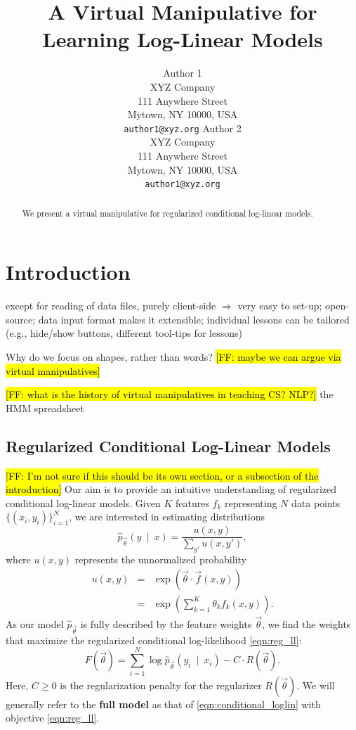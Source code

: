 \documentclass[11pt,letterpaper]{article}
\title{A Virtual Manipulative for Learning Log-Linear Models}
\author{
	 Author 1\\
	    XYZ Company\\
	    111 Anywhere Street\\
	    Mytown, NY 10000, USA\\
	    {\tt author1@xyz.org}
	  \And
	  Author 2\\
	    XYZ Company\\
	    111 Anywhere Street\\
	    Mytown, NY 10000, USA\\
	    {\tt author1@xyz.org}
 }
\date{}
\newcommand{\Note}[1]{}
\renewcommand{\Note}[1]{\hl{[#1]}}
\newcommand{\NoteSigned}[3]{{\sethlcolor{#2}\Note{#1: #3}}}
\newcommand{\NoteFF}[1]{\NoteSigned{FF}{LightBlue}{#1}}
\begin{document}
\maketitle

\begin{abstract}
We present a virtual manipulative for regularized conditional log-linear models. 
\end{abstract}

\section{Introduction}\label{sec:intro}
except for reading of data files, purely client-side $\Rightarrow$ very easy to set-up;
open-source;
data input format makes it extensible;
individual lessons can be tailored (e.g., hide/show buttons, different tool-tips for lessons)

Why do we focus on shapes, rather than words? \NoteFF{maybe we can argue via virtual manipulatives}

\NoteFF{what is the history of virtual manipulatives in teaching CS? NLP?} the HMM spreadsheet \cite{eisner-2002-tnlp}

\subsection{Regularized Conditional Log-Linear Models} \label{sec:model} 
\NoteFF{I'm not sure if this should be its own section, or a subsection of the introduction} 
Our aim is to provide an intuitive understanding of regularized conditional log-linear models. Given $K$ features $f_k$ representing $N$ data points $\{( x_i, y_i)\}_{i=1}^N$, we are interested in estimating distributions 
\begin{equation}
\hat{p}_{\vec{\theta}}\left(y\ \mid\ x\right) = \frac{u(x, y)}{\sum_{y'} u(x,y')},
\label{eqn:conditional_loglin}
\end{equation}
where $u(x,y)$ represents the unnormalized probability
\begin{eqnarray}
u(x,y) & = & \exp{\left(\vec{\theta}\cdot \vec{f}(x,y)\right)}\\
& = & \exp{\left(\sum_{k=1}^K \theta_k f_k(x,y)\right)}.
\end{eqnarray}
As our model $\hat{p}_{\vec{\theta}}$ is fully described by the feature weights $\vec{\theta}$, we find the weights that maximize the regularized conditional log-likelihood \eqref{eqn:reg_ll}:
\begin{equation}
F\left(\vec{\theta}\right) = \sum_{i=1}^N \log{\hat{p}_{\vec{\theta}}\left(y_i\ \mid\ x_i\right)} - C \cdot R\left(\vec{\theta}\right).
\label{eqn:reg_ll}
\end{equation}
Here, $C \ge 0$ is the regularization penalty for the regularizer $R(\vec{\theta})$. We will generally refer to the \textbf{full model} as that of \eqref{eqn:conditional_loglin} with objective \eqref{eqn:reg_ll}.
\end{document}
